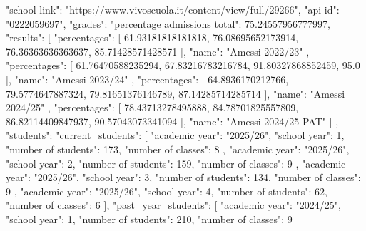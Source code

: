 {
        "school link": "https://www.vivoscuola.it/content/view/full/29266",
        "api id": "0222059697",
        "grades": {
            "percentage admissions total": 75.24557956777997,
            "results": [
                {
                    "percentages": [
                        61.93181818181818,
                        76.08695652173914,
                        76.36363636363637,
                        85.71428571428571
                    ],
                    "name": "Amessi 2022/23"
                },
                {
                    "percentages": [
                        61.76470588235294,
                        67.83216783216784,
                        91.80327868852459,
                        95.0
                    ],
                    "name": "Amessi 2023/24"
                },
                {
                    "percentages": [
                        64.8936170212766,
                        79.5774647887324,
                        79.81651376146789,
                        87.14285714285714
                    ],
                    "name": "Amessi 2024/25"
                },
                {
                    "percentages": [
                        78.43713278495888,
                        84.78701825557809,
                        86.82114409847937,
                        90.57043073341094
                    ],
                    "name": "Amessi 2024/25 PAT"
                }
            ]
        },
        "students": {
            "current_students": [
                {
                    "academic year": "2025/26",
                    "school year": 1,
                    "number of students": 173,
                    "number of classes": 8
                },
                {
                    "academic year": "2025/26",
                    "school year": 2,
                    "number of students": 159,
                    "number of classes": 9
                },
                {
                    "academic year": "2025/26",
                    "school year": 3,
                    "number of students": 134,
                    "number of classes": 9
                },
                {
                    "academic year": "2025/26",
                    "school year": 4,
                    "number of students": 62,
                    "number of classes": 6
                }
            ],
            "past_year_students": [
                {
                    "academic year": "2024/25",
                    "school year": 1,
                    "number of students": 210,
                    "number of classes": 9
}}}
